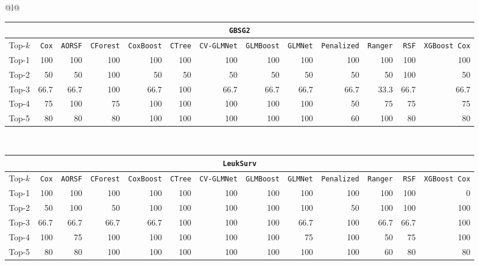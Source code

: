 \begin{longtable}{@{}l@{}}
\begin{tabular}{@{}l*{12}{r}@{}}
\multicolumn{13}{c}{\texttt{GBSG2}} \\
\midrule
Top-$k$ & \texttt{Cox} & \texttt{AORSF} & \texttt{CForest} & \texttt{CoxBoost} & \texttt{CTree} & \texttt{CV-GLMNet} & \texttt{GLMBoost} & \texttt{GLMNet} & \texttt{Penalized} & \texttt{Ranger} & \texttt{RSF} & \texttt{XGBoost Cox} \\
\midrule
Top-1 & 100 & 100 & 100 & 100 & 100 & 100 & 100 & 100 & 100 & 100 & 100 & 100 \\
Top-2 & 50 & 50 & 100 & 50 & 50 & 50 & 50 & 50 & 50 & 50 & 100 & 50 \\
Top-3 & 66.7 & 66.7 & 100 & 66.7 & 100 & 66.7 & 66.7 & 66.7 & 66.7 & 33.3 & 66.7 & 66.7 \\
Top-4 & 75 & 100 & 75 & 100 & 100 & 100 & 100 & 100 & 50 & 75 & 75 & 75 \\
Top-5 & 80 & 80 & 80 & 100 & 100 & 100 & 100 & 100 & 60 & 100 & 80 & 80 \\
\end{tabular} \\
\midrule

\begin{tabular}{@{}l*{12}{r}@{}}
\multicolumn{13}{c}{\texttt{LeukSurv}} \\
\midrule
Top-$k$ & \texttt{Cox} & \texttt{AORSF} & \texttt{CForest} & \texttt{CoxBoost} & \texttt{CTree} & \texttt{CV-GLMNet} & \texttt{GLMBoost} & \texttt{GLMNet} & \texttt{Penalized} & \texttt{Ranger} & \texttt{RSF} & \texttt{XGBoost Cox} \\
\midrule
Top-1 & 100 & 100 & 100 & 100 & 100 & 100 & 100 & 100 & 100 & 100 & 100 & 0 \\
Top-2 & 50 & 100 & 50 & 100 & 100 & 100 & 100 & 100 & 50 & 100 & 100 & 100 \\
Top-3 & 66.7 & 66.7 & 66.7 & 66.7 & 100 & 100 & 100 & 66.7 & 100 & 66.7 & 66.7 & 100 \\
Top-4 & 100 & 75 & 100 & 100 & 100 & 100 & 100 & 75 & 100 & 50 & 75 & 100 \\
Top-5 & 80 & 80 & 100 & 100 & 100 & 100 & 100 & 100 & 100 & 60 & 80 & 80 \\
\end{tabular} \\
\midrule


\end{longtable}
